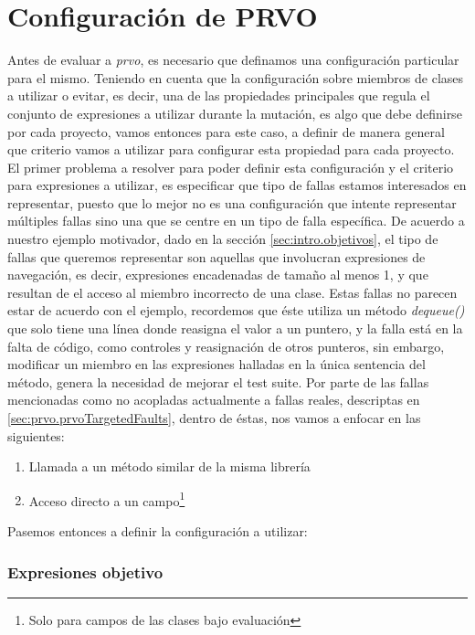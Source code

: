 \section{Configuraci\'on de PRVO}
\label{sec:evaluation.prvoconfig}

Antes de evaluar a \emph{prvo}, es necesario que definamos una configuraci\'on particular para el mismo. Teniendo en cuenta que la configuraci\'on sobre miembros de clases a utilizar o evitar, es decir, una de las propiedades principales que regula el conjunto de expresiones a utilizar durante la mutaci\'on, es algo que debe definirse por cada proyecto, vamos entonces para este caso, a definir de manera general que criterio vamos a utilizar para configurar esta propiedad para cada proyecto. El primer problema a resolver para poder definir esta configuraci\'on y el criterio para expresiones a utilizar, es especificar que tipo de fallas estamos interesados en representar, puesto que lo mejor no es una configuraci\'on que intente representar m\'ultiples fallas sino una que se centre en un tipo de falla espec\'ifica. De acuerdo a nuestro ejemplo motivador, dado en la secci\'on \ref{sec:intro.objetivos}, el tipo de fallas que queremos representar son aquellas que involucran expresiones de navegaci\'on, es decir, expresiones encadenadas de tama\~no al menos 1, y que resultan de el acceso al miembro incorrecto de una clase. Estas fallas no parecen estar de acuerdo con el ejemplo, recordemos que \'este utiliza un m\'etodo \emph{dequeue()} que solo tiene una l\'inea donde reasigna el valor a un puntero, y la falla est\'a en la falta de c\'odigo, como controles y reasignaci\'on de otros punteros, sin embargo, modificar un miembro en las expresiones halladas en la \'unica sentencia del m\'etodo, genera la necesidad de mejorar el test suite. Por parte de las fallas mencionadas como no acopladas actualmente a fallas reales, descriptas en \ref{sec:prvo.prvoTargetedFaults}, dentro de \'estas, nos vamos a enfocar en las siguientes:

\begin{enumerate}[label=\arabic*), leftmargin=.75cm,align=left]
	\item Llamada a un m\'etodo similar de la misma librer\'ia
	\item Acceso directo a un campo\footnote{Solo para campos de las clases bajo evaluaci\'on}
\end{enumerate}

Pasemos entonces a definir la configuraci\'on a utilizar:

\subsubsection{Expresiones objetivo}

